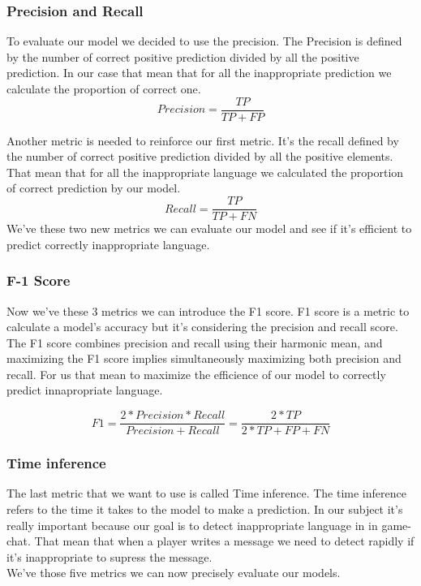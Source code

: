\documentclass[11pt,a4paper]{article}
\begin{document}
\subsubsection{Precision and Recall}

To evaluate our model we decided to use the precision. The Precision is defined by the number of correct positive prediction divided by all the positive prediction. In our case that mean that for all the inappropriate prediction we calculate the proportion of correct one.
\begin{equation}
Precision = \frac {TP}{TP+FP}
\end{equation}

Another metric is needed to reinforce our first metric. It’s the recall defined by the number of correct positive prediction divided by all the positive elements. That mean that for all the inappropriate language we calculated the proportion of correct prediction by our model. 
\begin{equation}
Recall = \frac {TP}{TP+FN}
\end{equation}
We’ve these two new metrics we can evaluate our model and see if it’s efficient to predict correctly inappropriate language.

\subsubsection{F-1 Score}
Now we’ve these 3 metrics we can introduce the F1 score. F1 score is a metric to calculate a model’s accuracy but it’s considering the precision and recall score. The F1 score combines precision and recall using their harmonic mean, and maximizing the F1 score implies simultaneously maximizing both precision and recall. For us that mean to maximize the efficience of our model to correctly predict innapropriate language.

\begin{equation}
F1 = \frac{2*Precision*Recall} {Precision + Recall} = \frac{2*TP}{2*TP+FP+FN}
\end{equation}

\subsubsection{Time inference}
The last metric that we want to use is called Time inference. The time inference refers to the time it takes to the model to make a prediction. In our subject it’s really important because our goal is to detect inappropriate language in in game-chat. That mean that when a player writes a message we need to detect rapidly if it’s inappropriate to supress the message.\\ 
We’ve those five metrics we can  now precisely evaluate our models.
\end{document}
